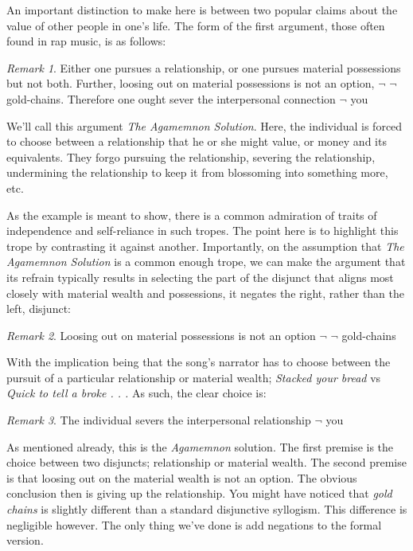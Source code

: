 \documentclass[phdthesis,12pt,final]{wuthesis}
\theoremstyle{definition}
\theoremstyle{definition}
\theoremstyle{definition}
\theoremstyle{definition}
\theoremstyle{remark}
\newtheorem*{remark}{Remark}
\begin{document}
An important distinction to make here is between two popular claims about the value of other people in one's life. The form of the first argument, those often found in rap music, is as follows:

\begin{remark}
Either one pursues a relationship, or one pursues material possessions but not both. Further, loosing out on material possessions is not an option, \(\lnot\) \(\lnot\) gold-chains. Therefore one ought sever the interpersonal connection \(\lnot\) you
\end{remark}

We'll call this argument \emph{The Agamemnon Solution}. Here, the individual is forced to choose between a relationship that he or she might value, or money and its equivalents. They forgo pursuing the relationship, severing the relationship, undermining the relationship to keep it from blossoming into something more, etc.

As the example is meant to show, there is a common admiration of traits of independence and self-reliance in such tropes. The point here is to highlight this trope by contrasting it against another. Importantly, on the assumption that \emph{The Agamemnon Solution} is a common enough trope, we can make the argument that its refrain typically results in selecting the part of the disjunct that aligns most closely with material wealth and possessions, it negates the right, rather than the left, disjunct:

\begin{remark}
Loosing out on material possessions is not an option \(\lnot\) \(\lnot\) gold-chains
\end{remark}

With the implication being that the song's narrator has to choose between the pursuit of a particular relationship or material wealth; \emph{Stacked your bread} vs \emph{Quick to tell a broke . . .} As such, the clear choice is:

\begin{remark}
The individual severs the interpersonal relationship \(\lnot\) you
\end{remark}

As mentioned already, this is the \emph{Agamemnon} solution. The first premise is the choice between two disjuncts; relationship or material wealth. The second premise is that loosing out on the material wealth is not an option. The obvious conclusion then is giving up the relationship. You might have noticed that \emph{gold chains} is slightly different than a standard disjunctive syllogism. This difference is negligible however. The only thing we've done is add negations to the formal version.
\end{document}

